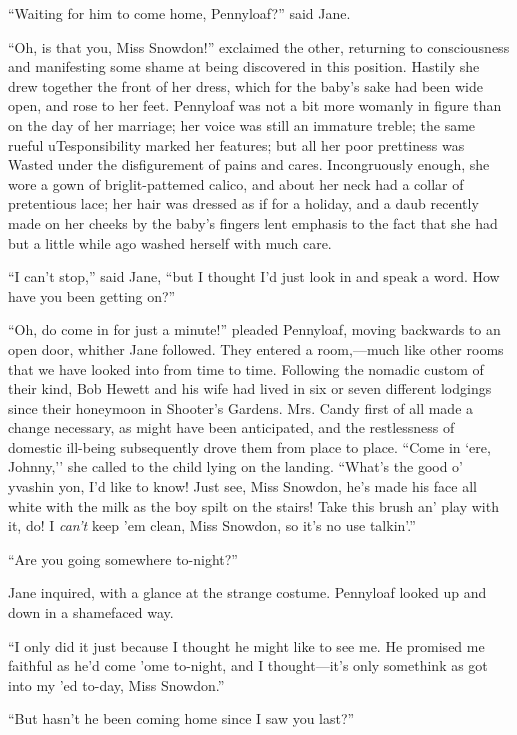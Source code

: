 ``Waiting for him to come home, Pennyloaf?'' said Jane.

``Oh, is that you, Miss Snowdon!'' exclaimed the other, returning to
consciousness and manifesting some shame at being discovered in this
position. Hastily she drew together the front of her dress, which for
the baby's sake had been wide open, and rose to her feet. Pennyloaf was
not a bit more womanly in figure than on the day of her marriage; her
voice was still an immature treble; the same rueful uTesponsibility
marked her features; but all her poor prettiness was
{\protect\hypertarget{27}{}{}}Wasted under the disfigurement of pains
and cares. Incongruously enough, she wore a gown of briglit-pattemed
calico, and about her neck had a collar of pretentious lace; her hair
was dressed as if for a holiday, and a daub recently made on her cheeks
by the baby's fingers lent emphasis to the fact that she had but a
little while ago washed herself with much care.

``I can't stop,'' said Jane, ``but I thought I'd just look in and speak
a word. How have you been getting on?''

``Oh, do come in for just a minute!'' pleaded Pennyloaf, moving
backwards to an open door, whither Jane followed. They entered a
room,---much like other rooms that we have looked into from time to
time. Following the nomadic custom of their kind, Bob Hewett and his
wife had lived in six or seven different lodgings since their honeymoon
in Shooter's Gardens. Mrs. Candy first of all made a change necessary,
as might have been anticipated, and the restlessness of domestic
ill-being subsequently drove them {\protect\hypertarget{28}{}{}}from
place to place. ``Come in `ere, Johnny,'' she called to the child lying
on the landing. ``What's the good o' yvashin yon, I'd like to know! Just
see, Miss Snowdon, he's made his face all white with the milk as the boy
spilt on the stairs! Take this brush an' play with it, do! I
\emph{can't} keep 'em clean, Miss Snowdon, so it's no use talkin'.''

``Are you going somewhere to-night?''

Jane inquired, with a glance at the strange costume. Pennyloaf looked up
and down in a shamefaced way.

``I only did it just because I thought he might like to see me. He
promised me faithful as he'd come 'ome to-night, and I thought---it's
only somethink as got into my 'ed to-day, Miss Snowdon.''

``But hasn't he been coming home since I saw you last?''

